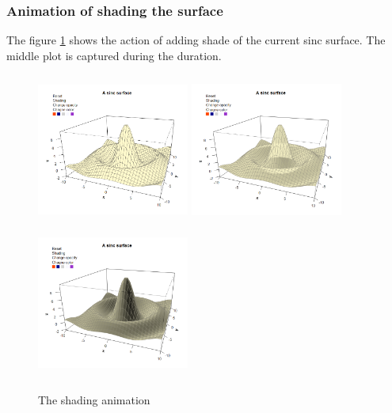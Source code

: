 \documentclass[paper=a4, fontsize=11pt]{report}
\begin{document}
\subsubsection*{Animation of shading the surface}
The figure \ref{Example_6.3.3} shows the action of adding shade of the current sinc surface. The middle plot is captured during the duration.
\begin{figure}[h]
\begin{center}
  \includegraphics[height = 5cm, width = 5cm]{figure/svg/origin_1.PNG}
  \includegraphics[height = 5cm, width = 5cm]{figure/svg/Shade_2.PNG}
  \includegraphics[height = 5cm, width = 5cm]{figure/svg/Shade_3.PNG}
  \caption{The shading animation}
  	\label{Example_6.3.3}
\end{center}
\end{figure}
\end{document}

